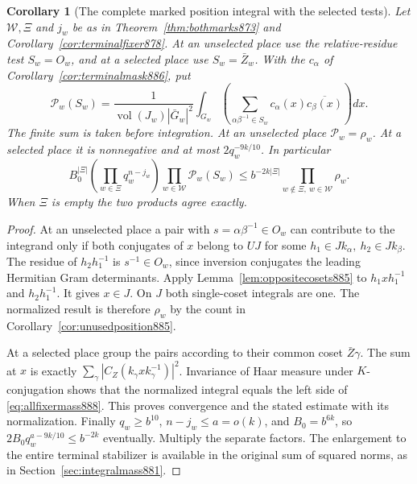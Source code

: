 \documentclass[a4paper,11pt]{article}
\newtheorem{corollary}[proposition]{Corollary}
\theoremstyle{definition}
\theoremstyle{remark}
\numberwithin{equation}{section}
\begin{document}
\begin{corollary}[The complete marked position integral with the selected tests]
\leavevmode\label{cor:allmarks888}
Let \(\mathcal W,\Xi\) and \(j_w\) be as in
Theorem~\ref{thm:bothmarks873} and
Corollary~\ref{cor:terminalfixer878}. At an unselected place use
the relative-residue test \(S_w=O_w\), and at a selected place
use \(S_w=\bar Z_w\). With the \(c_\alpha\) of
Corollary~\ref{cor:terminalmask886}, put
\[
 \mathcal P_w(S_w)=
 \frac1{\operatorname{vol}(J_w)|\bar G_w|^2}
 \int_{G_w}\left(\sum_{\alpha\beta^{-1}\in S_w}
                  c_\alpha(x)\overline{c_\beta(x)}\right)dx .
\]
The finite sum is taken before integration. At an unselected place
\(\mathcal P_w=\rho_w\). At a selected place it is nonnegative
and at most \(2q_w^{-9k/10}\). In particular
\begin{equation}
 B_0^{|\Xi|}\left(\prod_{w\in\Xi}q_w^{n-j_w}\right)
      \prod_{w\in\mathcal W}\mathcal P_w(S_w)
   \le b^{-2k|\Xi|}\prod_{w\notin\Xi,\ w\in\mathcal W}\rho_w .
 \label{eq:allmarks888}
\end{equation}
When \(\Xi\) is empty the two products agree exactly.
\end{corollary}
\begin{proof}
At an unselected place a pair with \(s=\alpha\beta^{-1}\in O_w\)
can contribute to the integrand only if both conjugates of \(x\)
belong to \(UJ\) for some \(h_1\in Jk_\alpha,\ h_2\in Jk_\beta\).
The residue of \(h_2h_1^{-1}\) is \(s^{-1}\in O_w\), since inversion
conjugates the leading Hermitian Gram determinants. Apply
Lemma~\ref{lem:oppositecosets885} to \(h_1 xh_1^{-1}\) and
\(h_2h_1^{-1}\). It gives \(x\in J\). On \(J\) both single-coset
integrals are one. The normalized result is therefore \(\rho_w\)
by the count in Corollary~\ref{cor:unusedposition885}.

At a selected place group the pairs according to their common
coset \(\bar Z\gamma\). The sum at \(x\) is exactly
\(\sum_\gamma|C_Z(k_\gamma x k_\gamma^{-1})|^2\).
Invariance of Haar measure under \(K\)-conjugation shows that
the normalized integral equals the left side of
\eqref{eq:allfixermass888}. This proves convergence and the
stated estimate with its normalization. Finally \(q_w\ge b^{10}\),
\(n-j_w\le a=o(k)\), and \(B_0=b^{6k}\), so
\(2B_0q_w^{a-9k/10}\le b^{-2k}\) eventually. Multiply the
separate factors. The enlargement to the entire terminal
stabilizer is available in the original sum of squared norms,
as in Section~\ref{sec:integralmass881}.
\end{proof}
\end{document}
